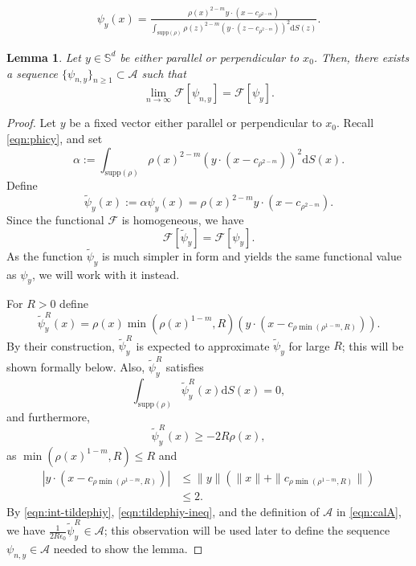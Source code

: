 \documentclass[10pt,a4paper]{amsart}
\newtheorem{lemma}{Lemma}
\newcommand{\bbs}{\mathbb S}
\newcommand{\calA}{\mathcal{A}}
\newcommand{\calF}{\mathcal{F}}
\newcommand{\dm}{d} %
\newcommand{\dx}{\mathrm{d}S (x)}
\newcommand{\dz}{\mathrm{d}S (z)}
\newcommand{\supp}{\mathrm{supp}(\rho)}
\begin{document}
\begin{align}\label{eqn:phicy}
\psi_y(x)=\frac{\rho(x)^{2-m}y\cdot(x-c_{\rho^{2-m}})}{\int_{\supp}\rho(z)^{2-m}\left(y\cdot (z-c_{\rho^{2-m}})\right)^2\dz}.
\end{align}

\begin{lemma}\label{lem:approx} Let $y\in \bbs^\dm$ be either parallel or perpendicular to $x_0$. Then, there exists a sequence $\{\psi_{n, y}\}_{n\geq1}\subset \mathcal{A}$ such that
\[
\lim_{n\to\infty}\mathcal{F}[\psi_{n,y}]=\mathcal{F}[\psi_{y}].
\]
\end{lemma}

\begin{proof}
Let $y$ be a fixed vector either parallel or perpendicular to $x_0$. Recall \eqref{eqn:phicy}, and set
\[
\alpha:=\int_{\supp}\rho(x)^{2-m}\left(y\cdot (x-c_{\rho^{2-m}})\right)^2\dx.
\]
Define 
\[
\tilde{\psi}_y(x):=\alpha\psi_y(x)=\rho(x)^{2-m}y\cdot(x-c_{\rho^{2-m}}).
\]
Since the functional $\calF$ is homogeneous, we have
\begin{equation}
\label{eqn:Ftildephi=Fphi}
\mathcal{F}[\tilde{\psi}_y]=\mathcal{F}[\psi_y].
\end{equation}
As the function $\tilde{\psi}_y$ is much simpler in form and yields the same functional value as $\psi_y$, we will work with it instead.

For $R>0$ define
\[
\tilde{\psi}_y^R(x)=\rho(x)\min(\rho(x)^{1-m}, R)\left(y\cdot\left(x-c_{\rho\min(\rho^{1-m}, R)}\right)\right).
\]
By their construction, $\tilde{\psi}_y^R$ is expected to approximate $\tilde{\psi}_y$ for large $R$; this will be shown formally below. Also, $\tilde{\psi}_y^R$ satisfies
\begin{equation}
\label{eqn:int-tildephiy}
\int_{\supp}\tilde{\psi}_y^R(x)\dx=0,
\end{equation}
and furthermore,
\begin{equation}
\label{eqn:tildephiy-ineq}
\tilde{\psi}_y^R(x)\geq -2R\rho(x),
\end{equation}
as $\min(\rho(x)^{1-m},R)\leq R$ and 
\begin{align*}
\left|y\cdot\left(x-c_{\rho \min(\rho^{1-m}, R)}\right)\right| &\leq \|y\| \left( \|x\| + \| c_{\rho \min(\rho^{1-m}, R)}\| \right) \\[2pt]
&\leq 2.
\end{align*}
By \eqref{eqn:int-tildephiy}, \eqref{eqn:tildephiy-ineq}, and the definition of $\calA$ in \eqref{eqn:calA}, we have $\frac{1}{2R\epsilon_0}\tilde{\psi}_y^R\in\mathcal{A}$; this observation will be used later to define the sequence $\psi_{n,y} \in \calA$ needed to show the lemma.


\end{proof}
\end{document}
